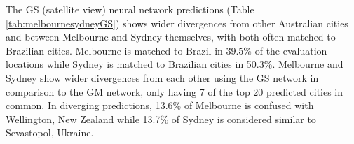 \documentclass[10pt,letterpaper]{article}
\begin{document}
\begin{table}[!htbp]
\begin{adjustwidth}{-2.25in}{0in}
\begin{tabular}{ l l l l l}
\hline
\end{tabular}
\end{adjustwidth}
\end{table}

The GS (satellite view) neural network predictions (Table \ref{tab:melbournesydneyGS}) shows wider divergences from other Australian cities and between Melbourne and Sydney themselves, with both often matched to Brazilian cities. Melbourne is matched to Brazil in 39.5\% of the evaluation locations while Sydney is matched to Brazilian cities in 50.3\%. Melbourne and Sydney show wider divergences from each other using the GS network in comparison to the GM network, only having 7 of the top 20 predicted cities in common. In diverging predictions, 13.6\% of Melbourne is confused with Wellington, New Zealand while 13.7\% of Sydney is considered similar to Sevastopol, Ukraine. 
\end{document}
